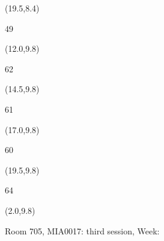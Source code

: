 \documentclass[a4paper]{article}
\newcommand{\myseat}[4]{%
\vspace{-0.1cm} \hspace{-0.5cm}
\parbox[t][2.2cm][t]{3.5cm}{%
\small #1 %
\begin{description}
\vspace{-0.1cm}
\item [ID:] #2
\vspace{-0.1cm}
\item [Team:] #3 \normalsize
\vspace{-0.1cm}
\item \normalsize #4
\vspace{-0.1cm}
\end{description}
}
}
\begin{document}
\begin{CJK}{UTF8}{cyberbit}
\begin{textblock}{2.5}(19.5,8.4)
\textblockcolor{}
\myseat{49}{}{}{}
\end{textblock}


\begin{textblock}{2.5}(12.0,9.8)
\textblockcolor{}
\myseat{62}{}{}{}
\end{textblock}

\begin{textblock}{2.5}(14.5,9.8)
\textblockcolor{}
\myseat{61}{}{}{}
\end{textblock}

\begin{textblock}{2.5}(17.0,9.8)
\textblockcolor{}
\myseat{60}{}{}{}
\end{textblock}

\begin{textblock}{2.5}(19.5,9.8)
\textblockcolor{}
\myseat{64}{}{}{}
\end{textblock}

\begin{textblock}{10}(2.0,9.8)
\textblockcolor{}
\parbox[t][2.2cm][t]{9.5cm}{%
\large Room 705, MIA0017: third session, Week: 
\vspace{-0.3cm} \hspace{-0.5cm}
}
\end{textblock}

\end{CJK}
\end{document}
